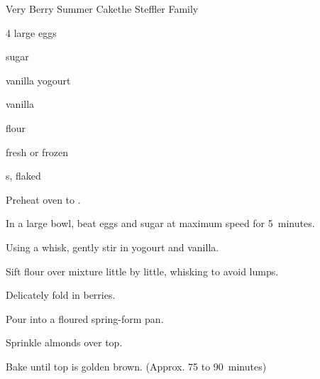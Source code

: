 \begin{recipe}{Very Berry Summer Cake}{the Steffler Family}{}

\begin{ingredients}
\item 4 large eggs
\item \C{\threequarter} sugar
\item {} vanilla yogourt
\item {} vanilla
\item \C{1\quarter} flour
\item {} fresh or frozen 
\item \C{\quarter} s, flaked 
\end{ingredients}

\begin{directions}
\item Preheat oven to .
\item In a large bowl, beat eggs and sugar at maximum speed for 5~minutes.
\item Using a whisk, gently stir in yogourt and vanilla.
\item Sift flour over mixture little by little, whisking to avoid lumps.
\item Delicately fold in berries.
\item Pour into a floured spring-form pan.
\item Sprinkle almonds over top.
\item Bake until top is golden brown. (Approx. 75 to 90~minutes)
\end{directions}
\end{recipe}
